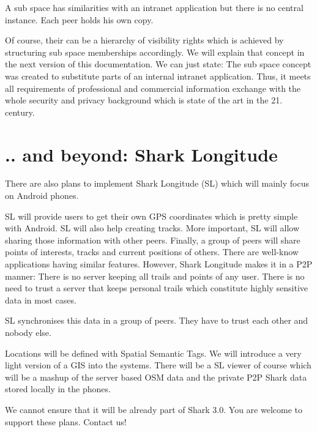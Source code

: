 A sub space has similarities with an intranet application but there is no central instance. Each peer holds his own copy.

Of course, their can be a hierarchy of visibility rights which is achieved by structuring sub space memberships accordingly. We will explain that concept in the next version of this documentation. We can just state: The sub space concept was created to substitute parts of an internal intranet application. Thus, it meets all requirements of professional and commercial information exchange with the whole security and privacy background which is state of the art in the 21. century.

\section{.. and beyond: Shark Longitude}
There are also plans to implement Shark Longitude (SL) which will mainly focus on Android phones.

SL will provide users to get their own GPS coordinates which is pretty simple with Android. SL will also help creating tracks. More important, SL will allow sharing those information with other peers. Finally, a group of peers will share points of interests, tracks and current positions of others. There are well-know
applications having similar features. However, Shark Longitude makes it in a P2P manner: There is no server keeping all trails and points of any user. There is no need to trust a server that keeps personal trails which constitute highly sensitive data in most cases.

SL synchronises this data in a group of peers. They have to trust each other and nobody else.

Locations will be defined with Spatial Semantic Tags. We will introduce a very light version of a GIS into the systems. There will be a SL viewer of course which will be a mashup of the server based OSM data and the private P2P Shark data stored locally in the phones.

We cannot ensure that it will be already part of Shark 3.0. You are welcome to support these plans. Contact us!
